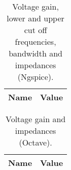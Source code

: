 \noindent
\begin{minipage}[c]{0.5\linewidth}

\begin{table}[H]
 \centering
 \begin{tabular}{|l|r|}
 \hline
 {\bf Name} & {\bf Value} \\ \hline


 \end{tabular}
 \caption{Voltage gain, lower and upper cut off frequencies, bandwidth and impedances (Ngspice).}
 \label{tab:spice}
 \end{table}
 
\end{minipage}
\begin{minipage}[c]{0.5\linewidth}
 
 \begin{table}[H]
 \centering
 \begin{tabular}{|l|r|}
 \hline
 {\bf Name} & {\bf Value} \\ \hline


 \end{tabular}
 \caption{Voltage gain and impedances (Octave).}
 \label{tab:spice}
 \end{table}
 
\end{minipage}


